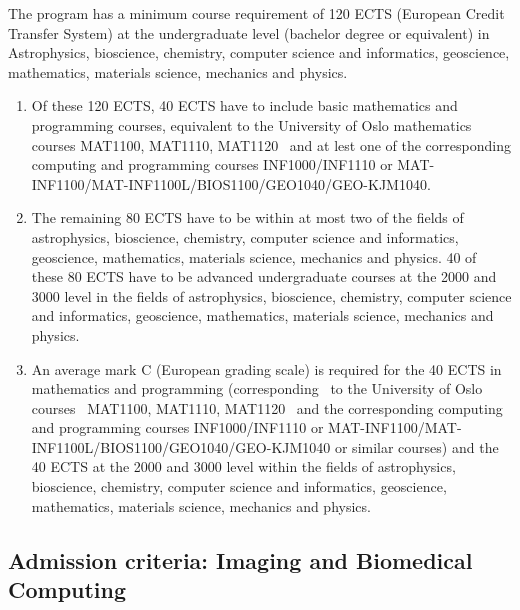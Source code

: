 \documentclass[%
oneside,                 %
final,                   %
10pt]{article}
\begin{document}
The program has a minimum course requirement of 120 ECTS (European Credit Transfer System) at the undergraduate level (bachelor degree or equivalent) in Astrophysics, bioscience, chemistry, computer science and informatics, geoscience, mathematics, materials science, mechanics and physics. 
\begin{enumerate}
\item Of these 120 ECTS, 40 ECTS have to include basic mathematics and programming courses, equivalent to the University of Oslo mathematics courses MAT1100, MAT1110, MAT1120  and at lest one of the corresponding computing and programming courses INF1000/INF1110 or MAT-INF1100/MAT-INF1100L/BIOS1100/GEO1040/GEO-KJM1040. 

\item The remaining 80 ECTS have to be within at most two of the fields of astrophysics, bioscience, chemistry, computer science and informatics, geoscience, mathematics, materials science, mechanics and physics. 40 of these 80 ECTS have to be advanced undergraduate courses at the 2000 and 3000 level in the fields of astrophysics, bioscience, chemistry, computer science and informatics, geoscience, mathematics, materials science, mechanics and physics.

\item An average mark C (European grading scale) is required for the 40 ECTS in mathematics and programming (corresponding  to the University of Oslo courses  MAT1100, MAT1110, MAT1120  and the corresponding computing and programming courses INF1000/INF1110 or MAT-INF1100/MAT-INF1100L/BIOS1100/GEO1040/GEO-KJM1040 or similar courses) and the 40 ECTS at the 2000 and 3000 level within the fields of astrophysics, bioscience, chemistry, computer science and informatics, geoscience, mathematics, materials science, mechanics and physics.
\end{enumerate}

\noindent
\subsection{Admission criteria: Imaging and Biomedical Computing}
\end{document}
